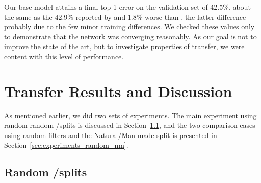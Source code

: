 
Our base model attains a final top-1 error on the validation set of 42.5\%, about the same as the 42.9\% reported by \cite{donahue+jia-2013-arxiv} and 1.8\% worse than \cite{Krizhevsky-2012}, the latter difference probably due to the few minor training differences. We checked these values only to demonstrate that the network was converging reasonably. As our goal is not to improve the state of the art, but to investigate properties of transfer, we were content with this level of performance.






\section{Transfer Results and Discussion}
\label{sec:experiments}


As mentioned earlier, we did two sets of experiments. The main experiment using random random \dA/\dB splits is discussed in Section~\ref{sec:experiments_ab}, and the two comparison cases using random filters and the Natural/Man-made split is presented in Section~\ref{sec:experiments_random_nm}.




\subsection{Random \dA/\dB splits}
\label{sec:experiments_ab}


